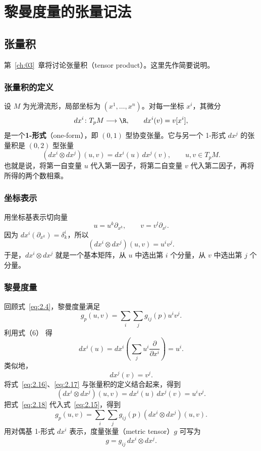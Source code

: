 \section{黎曼度量的张量记法}
\subsection{张量积}
第~\ref{ch:03}~章将讨论张量积（tensor product）。这里先作简要说明。

\subsubsection{张量积的定义}
设 $M$ 为光滑流形，局部坐标为 $(x^1,\ldots,x^n)$。对每一坐标 $x^i$，其微分
\[
  dx^i\colon T_pM\longrightarrow\R,\qquad dx^i(v)=v[x^i],
\]
是一个\textbf{1-形式}（one-form），即 $(0,1)$ 型协变张量。它与另一个 1-形式 $dx^j$ 的张量积是 $(0,2)$ 型张量
\[
  (dx^i\otimes dx^j)(u,v)=dx^i(u)\,dx^j(v),\qquad u,v\in T_pM.
\]
也就是说，将第一自变量 $u$ 代入第一因子，将第二自变量 $v$ 代入第二因子，再将所得的两个数相乘。

\subsubsection{坐标表示}
用坐标基表示切向量
\[
  u=u^k\partial_{x^k},\qquad v=v^l\partial_{x^l}.
\]
因为 $dx^i(\partial_{x^k})=\delta^i_k$，所以
\[
  (dx^i\otimes dx^j)(u,v)=u^i v^j.
\]
于是，$dx^i\otimes dx^j$ 就是一个基本矩阵，从 $u$ 中选出第 $i$ 个分量，从 $v$ 中选出第 $j$ 个分量。

\subsubsection{黎曼度量}
回顾式~\eqref{eq:2.4}，黎曼度量满足
\begin{equation*}
  g_p(u,v)=\sum_i\sum_j g_{ij}(p)u^iv^j.
  \tag{2.15}\label{eq:2.15}
\end{equation*}
利用式（6） 得
\begin{equation*}
  dx^i(u)=dx^i\!\left(\sum_j u^i\frac{\partial}{\partial x^i}\right)=u^i.
  \tag{2.16}\label{eq:2.16}
\end{equation*}
类似地，
\begin{equation*}
  dx^j(v)=v^j.
  \tag{2.17}\label{eq:2.17}
\end{equation*}
将式~\eqref{eq:2.16}、\eqref{eq:2.17} 与张量积的定义结合起来，得到
\begin{equation*}
  (dx^i\otimes dx^j)(u,v)=dx^i(u)\,dx^j(v)=u^iv^j.
  \tag{2.18}\label{eq:2.18}
\end{equation*}
把式~\eqref{eq:2.18} 代入式~\eqref{eq:2.15}，得到
\begin{equation*}
  g_p(u,v)=\sum_i\sum_j g_{ij}(p)(dx^i\otimes dx^j)(u,v).
  \tag{2.19}\label{eq:2.19}
\end{equation*}
用对偶基 1-形式 $dx^i$ 表示，度量张量（metric tensor）$g$ 可写为
\begin{equation*}
  g=g_{ij}\,dx^i\otimes dx^j.
  \tag{2.20}\label{eq:2.20}
\end{equation*}

